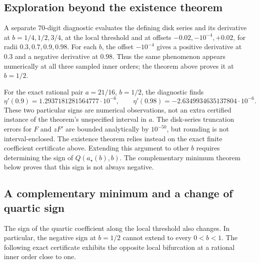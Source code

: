 \subsection{Exploration beyond the existence theorem}

A separate 70-digit diagnostic evaluates the defining disk series and its
derivative at $b=1/4,1/2,3/4$, at the local threshold and at offsets
$-0.02,-10^{-4},+0.02$, for radii $0.3,0.7,0.9,0.98$. For each
$b$, the offset $-10^{-4}$ gives a positive derivative at $0.3$ and
a negative derivative at $0.98$. Thus the same phenomenon appears
numerically at all three sampled inner orders; the theorem above proves
it at $b=1/2$.

For the exact rational pair $a=21/16$, $b=1/2$, the diagnostic finds
\[
 \eta'(0.9)=1.2937181281564777\cdot10^{-6},\qquad
 \eta'(0.98)=-2.6349934635137804\cdot10^{-6}.
\]
These two particular signs are numerical observations, not an extra
certified instance of the theorem's unspecified interval in $a$.
The disk-series truncation errors for $F$ and $zF'$ are bounded
analytically by $10^{-50}$, but rounding is not interval-enclosed.
The existence theorem relies instead on the exact finite coefficient
certificate above. Extending this argument to other $b$ requires
determining the sign of $Q(a_\star(b),b)$. The complementary
minimum theorem below proves that this sign is not always negative.

\subsection{A complementary minimum and a change of quartic sign}
\label{turn:sec:minimum}

The sign of the quartic coefficient along the local threshold also
changes. In particular, the negative sign at $b=1/2$ cannot extend to
every $0<b<1$. The following exact certificate exhibits the opposite
local bifurcation at a rational inner order close to one.

